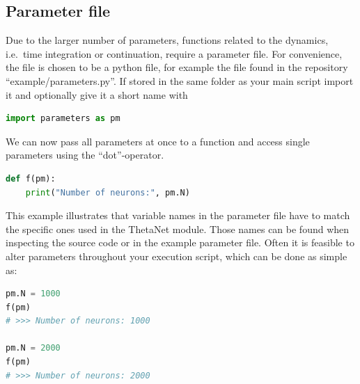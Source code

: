 \documentclass[bibliography=totoc, twoside]{article}
\numberwithin{equation}{section}
\begin{document}
\subsection*{Parameter file}
Due to the larger number of parameters, functions related to the dynamics, i.e.\ time integration or continuation, require a parameter file.
For convenience, the file is chosen to be a python file, for example the file found in the repository ``example/parameters.py''.
If stored in the same folder as your main script import it and optionally give it a short name with
\begin{lstlisting}[language=python]
import parameters as pm
\end{lstlisting}
We can now pass all parameters at once to a function and access single parameters using the ``dot''-operator.
\begin{lstlisting}[language=python]
def f(pm):
    print("Number of neurons:", pm.N)
\end{lstlisting}
This example illustrates that variable names in the parameter file have to match the specific ones used in the ThetaNet module.
Those names can be found when inspecting the source code or in the example parameter file.
Often it is feasible to alter parameters throughout your execution script, which can be done as simple as:
\begin{lstlisting}[language=python]
pm.N = 1000
f(pm)
# >>> Number of neurons: 1000

pm.N = 2000
f(pm)
# >>> Number of neurons: 2000
\end{lstlisting}
\end{document}
